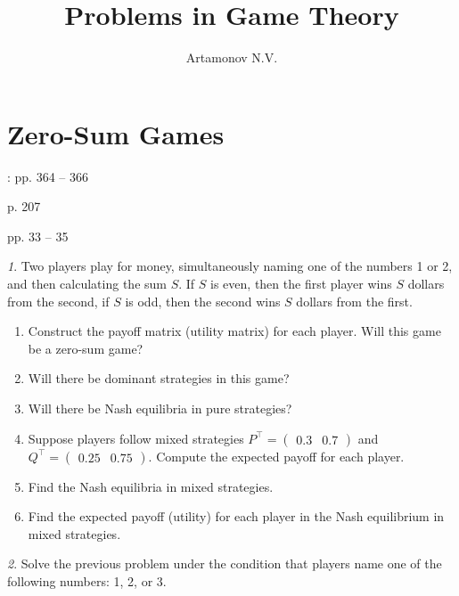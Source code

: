 \documentclass[12pt]{article}
\title{Problems in Game Theory}
\author{Artamonov N.V.}
\theoremstyle{remark}
\newtheorem{exercise}{}[subsection]
\begin{document}
\maketitle

\tableofcontents

\section{Zero-Sum Games}

\cite{Asoke}: pp. 364 -- 366

\noindent\cite{Eichhorn} p. 207

\noindent\cite{Peters} pp. 33 -- 35


\begin{exercise}%
Two players play for money, simultaneously naming one of the numbers 1 or 2,
and then calculating the sum $S$. If $S$ is even, then the first player wins $S$ dollars from the second,
if $S$ is odd, then the second wins $S$ dollars from the first.
\begin{enumerate}
	\item Construct the payoff matrix (utility matrix) for each player.
	Will this game be a zero-sum game? %
	\item Will there be dominant strategies in this game? %
	\item Will there be Nash equilibria in pure strategies? %
	\item Suppose players follow mixed strategies
	\(P^\top=\begin{pmatrix} 0.3 & 0.7\end{pmatrix}\) and \(Q^\top=\begin{pmatrix} 0.25 & 0.75\end{pmatrix}\).
	Compute the expected payoff for each player.
	\item Find the Nash equilibria in mixed strategies.
	\item Find the expected payoff (utility) for each player
	in the Nash equilibrium in mixed strategies.
\end{enumerate}
\end{exercise}

\begin{exercise}
Solve the previous problem under the condition that players name one of
the following numbers: 1, 2, or 3.
\end{exercise}
\end{document}
